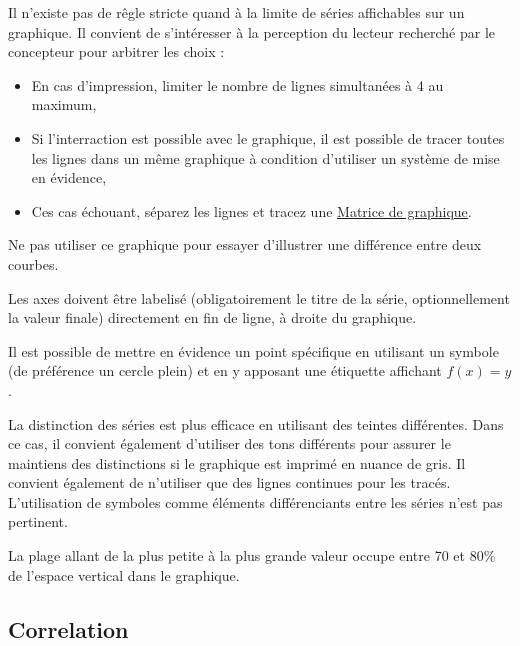 \documentclass[a4paper,12pt]{article}
\begin{document}
\begin{multicols}{2}
Il n'existe pas de rêgle stricte quand à la limite de séries affichables sur un graphique.\autocite{jonathanschwabishTime2021} Il convient de s'intéresser à la perception du lecteur recherché par le concepteur pour arbitrer les choix : \autocite{jonathanschwabishTime2021}
\begin{itemize}
\item En cas d'impression, limiter le nombre de lignes simultanées à 4 au maximum, \autocite{wongWallStreetJournal2010}
\item Si l'interraction est possible avec le graphique, il est possible de tracer toutes les lignes dans un même graphique à condition d'utiliser un système de mise en évidence,\autocite{jonathanschwabishTime2021}
\item Ces cas échouant, séparez les lignes et tracez une \hyperref[sec:org44b2ac7]{Matrice de graphique}.
\end{itemize}

Ne pas utiliser ce graphique pour essayer d'illustrer une différence entre deux courbes. \autocite{jonathanschwabishTime2021}

Les axes doivent être labelisé (obligatoirement le titre de la série, optionnellement la valeur finale) directement en fin de ligne, à droite du graphique. \autocite{andreaskrauseBestPracticesData2024,sosulskiGraphics2019}

Il est possible de mettre en évidence un point spécifique en utilisant un symbole (de préférence un cercle plein) et en y apposant une étiquette affichant \(f(x)=y\).

La distinction des séries est plus efficace en utilisant des teintes différentes. Dans ce cas, il convient également d'utiliser des tons différents pour assurer le maintiens des distinctions si le graphique est imprimé en nuance de gris. \autocite{stephenfewComponentlevelGraphDesign2012}
Il convient également de n'utiliser que des lignes continues pour les tracés. \autocite{stephenfewComponentlevelGraphDesign2012}
L'utilisation de symboles comme éléments différenciants entre les séries n'est pas pertinent. \autocite{stephenfewComponentlevelGraphDesign2012}

La plage allant de la plus petite à la plus grande valeur occupe entre 70 et 80\% de l'espace vertical dans le graphique.\autocite{mikecisnerosWhatLineGraph2024}
\subsection*{Correlation}
\label{sec:org42d95de}


\end{multicols}
\end{document}
